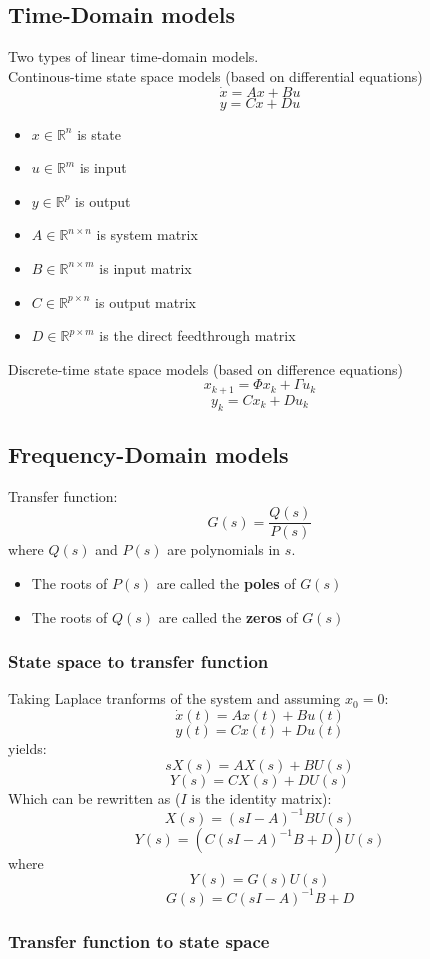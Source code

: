 \subsection{Time-Domain models}
Two types of linear time-domain models. \\
Continous-time state space models
(based on differential equations)
$$\dot{x} = Ax+Bu$$
$$y=Cx+Du$$
\begin{itemize}
  \item $x\in \mathbb{R}^n$ is state
  \item $u\in \mathbb{R}^m$ is input
  \item $y\in \mathbb{R}^p$ is output
  \item $A\in \mathbb{R}^{n\times n}$ is system matrix
  \item $B\in \mathbb{R}^{n\times m}$ is input matrix
  \item $C\in \mathbb{R}^{p\times n}$ is output matrix
  \item $D\in \mathbb{R}^{p\times m}$ is the direct feedthrough matrix
\end{itemize}
Discrete-time state space models (based on difference equations)
$$x_{k+1} = \Phi x_k + \Gamma u_k$$
$$y_k = Cx_k + Du_k$$

\subsection{Frequency-Domain models}
Transfer function:
$$G(s)=\frac{Q(s)}{P(s)}$$
where $Q(s)$ and $P(s)$ are polynomials in $s$.
\begin{itemize}
  \item The roots of $P(s)$ are called the \textbf{poles} of $G(s)$
  \item The roots of $Q(s)$ are called the \textbf{zeros} of $G(s)$
\end{itemize}
\subsubsection{State space to transfer function}
Taking Laplace tranforms of the system and assuming $x_0=0$:
$$\dot{x}(t)=Ax(t)+Bu(t)$$
$$y(t)=Cx(t)+Du(t)$$
yields:
$$sX(s)=AX(s)+BU(s)$$
$$Y(s)=CX(s)+DU(s)$$
Which can be rewritten as ($I$ is the identity matrix):
$$X(s)=\left(sI-A\right)^{-1}BU(s)$$
$$Y(s)=\left(C\left(sI-A\right)^{-1}B+D\right)U(s)$$
where
$$Y(s)=G(s)U(s)$$
$$G(s)=C\left(sI-A\right)^{-1}B+D$$
\subsubsection{Transfer function to state space}

